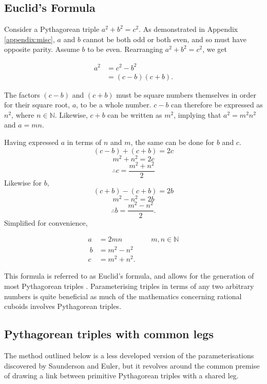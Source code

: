 \documentclass[11pt]{article}
\begin{document}
\subsection{Euclid's Formula}
Consider a Pythagorean triple $a^2+b^2=c^2$. As demonstrated in Appendix \ref{appendix:misc}, $a$ and $b$ cannot be both odd or both even, and so must have opposite parity. Assume $b$ to be even.
Rearranging $a^2+b^2=c^2$, we get

\begin{equation*}
\begin{aligned}
a^2 &= c^2-b^2 \\
&= (c-b)(c+b).
\end{aligned}
\end{equation*}

The factors $(c-b)$ and $(c+b)$ must be square numbers themselves in order for their square root, $a$, to be a whole number. $c-b$ can therefore be expressed as $n^2$, where $n\in{\mathbb{N}}$.
Likewise, $c+b$ can be written as $m^2$, implying that $a^2=m^2n^2$ and $a=mn$.

Having expressed $a$ in terms of $n$ and $m$, the same can be done for $b$ and $c$.
$$(c-b)+(c+b)=2c$$
$$m^2+n^2=2c$$
$$\therefore c=\frac{m^2+n^2}{2}$$
Likewise for $b$,
$$(c+b)-(c+b)=2b$$
$$m^2-n^2=2b$$
$$\therefore b=\frac{m^2-n^2}{2}.$$
Simplified for convenience, 

\begin{equation}
\begin{aligned}
a &= 2mn     \qquad\qquad m, n \in{\mathbb{N}}\\\
b &= m^2-n^2 \\
c &= m^2+n^2.
\end{aligned}
\label{eq:2}
\end{equation}

This formula is referred to as Euclid's formula, and allows for the generation of most Pythagorean triples \cite{euclidsformula}. Parameterising triples in terms of any two arbitrary numbers is quite beneficial as much of the mathematics concerning rational cuboids involves Pythagorean triples.
\subsection{Pythagorean triples with common legs}
The method outlined below is a less developed version of the parameterisations discovered by Saunderson and Euler, but it revolves around the common premise of drawing a link between primitive Pythagorean triples with a shared leg.
\end{document}
